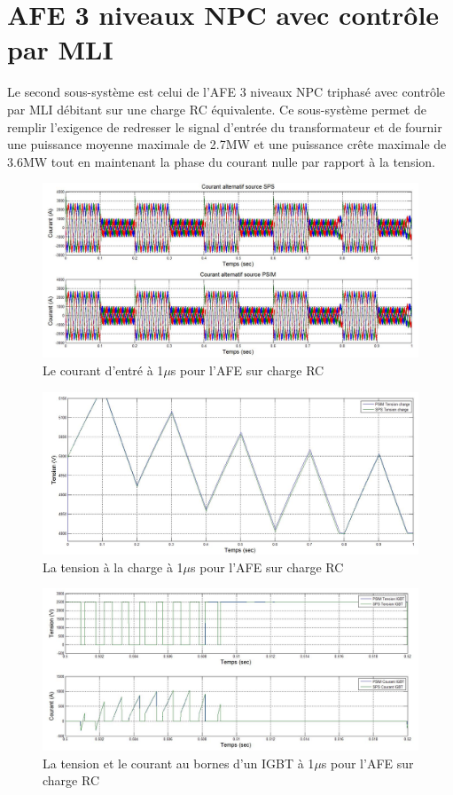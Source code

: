 \section{AFE 3 niveaux NPC avec contrôle par MLI}
Le second sous-système est celui de l'AFE 3 niveaux NPC triphasé avec contrôle par MLI débitant sur une charge RC équivalente. Ce sous-système permet de remplir l'exigence de redresser le signal d'entrée du transformateur et de fournir une puissance moyenne maximale de 2.7MW et une puissance crête maximale de 3.6MW tout en maintenant la phase du courant nulle par rapport à la tension.
\begin{figure}[htb]
\centering
\includegraphics[scale=0.5]{fig/coual_afe.jpg}
\caption{Le courant d'entré à 1$\mu$s pour l'AFE sur charge RC}
\label{AF_RC_cou}
\end{figure}




\begin{figure}[htb]
\centering
\includegraphics[scale=0.5]{fig/ten_afe.jpg}
\caption{La tension à la charge à 1$\mu$s pour l'AFE sur charge RC}
\label{AF_RC_ten}
\end{figure}



\begin{figure}[htb]
\centering
\includegraphics[scale=0.5]{fig/com_afe.jpg}
\caption{La tension et le courant au bornes d'un IGBT à 1$\mu$s pour l'AFE sur charge RC}
\label{AF_RC_igbt}
\end{figure}

